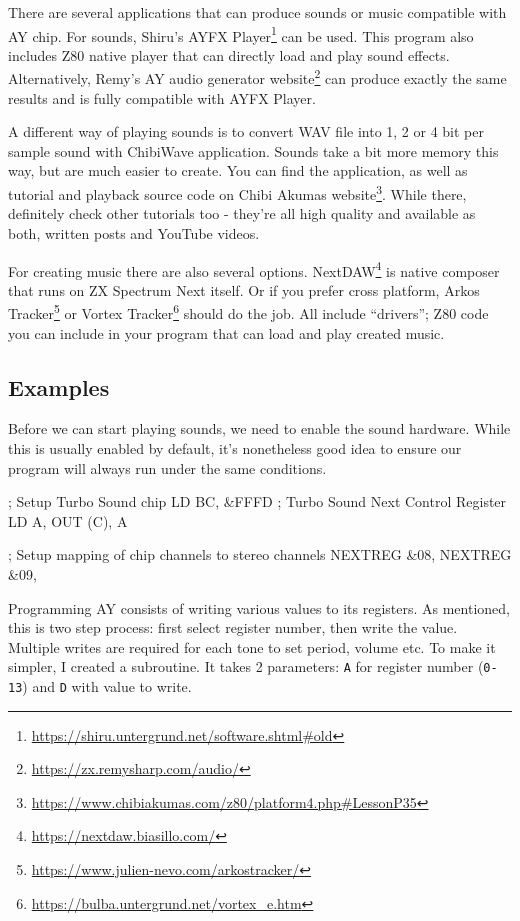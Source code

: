 There are several applications that can produce sounds or music compatible with AY chip. For sounds, Shiru's AYFX Player\footnote{\url{https://shiru.untergrund.net/software.shtml#old}} can be used. This program also includes Z80 native player that can directly load and play sound effects. Alternatively, Remy's AY audio generator website\footnote{\url{https://zx.remysharp.com/audio/}} can produce exactly the same results and is fully compatible with AYFX Player.

A different way of playing sounds is to convert WAV file into 1, 2 or 4 bit per sample sound with ChibiWave application. Sounds take a bit more memory this way, but are much easier to create. You can find the application, as well as tutorial and playback source code on Chibi Akumas website\footnote{\url{https://www.chibiakumas.com/z80/platform4.php#LessonP35}}. While there, definitely check other tutorials too - they're all high quality and available as both, written posts and YouTube videos.

For creating music there are also several options. NextDAW\footnote{\url{https://nextdaw.biasillo.com/}} is native composer that runs on ZX Spectrum Next itself. Or if you prefer cross platform, Arkos Tracker\footnote{\url{https://www.julien-nevo.com/arkostracker/}} or Vortex Tracker\footnote{\url{https://bulba.untergrund.net/vortex_e.htm}} should do the job. All include ``drivers''; Z80 code you can include in your program that can load and play created music.


\pagebreak
\subsection{Examples}

Before we can start playing sounds, we need to enable the sound hardware. While this is usually enabled by default, it's nonetheless good idea to ensure our program will always run under the same conditions.

\begin{tcblisting}{}
	; Setup Turbo Sound chip
	LD BC, &FFFD            ; Turbo Sound Next Control Register
	LD A, %
	OUT (C), A
	
	; Setup mapping of chip channels to stereo channels
	NEXTREG &08, %
	NEXTREG &09, %
\end{tcblisting}

Programming AY consists of writing various values to its registers. As mentioned, this is two step process: first select register number, then write the value. Multiple writes are required for each tone to set period, volume etc. To make it simpler, I created a subroutine. It takes 2 parameters: {\tt A} for register number ({\tt 0-13}) and {\tt D} with value to write.

